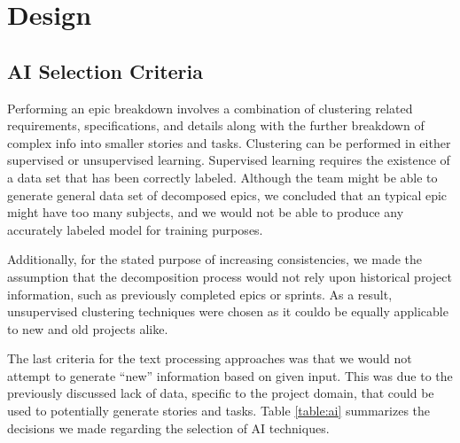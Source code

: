 \section{Design}
\label{design}

\subsection{AI Selection Criteria}
\label{subsection:criteria}
Performing an epic breakdown involves a combination of clustering related requirements, specifications, and details along with the further breakdown of complex info into smaller stories and tasks. Clustering can be performed in either supervised or unsupervised learning. Supervised learning requires the existence of a data set that has been correctly labeled. Although the team might be able to generate general data set of decomposed epics, we concluded that an typical epic might have too many subjects, and we would not be able to produce any accurately labeled model for training purposes. 

Additionally, for the stated purpose of increasing consistencies, we made the assumption that the decomposition process would not rely upon historical project information, such as previously completed epics or sprints. As a result, unsupervised clustering techniques were chosen as it couldo be equally applicable to new and old projects alike.

The last criteria for the text processing approaches was that we would not attempt to generate ``new'' information based on given input. This was due to the previously discussed lack of data, specific to the project domain, that could be used to potentially generate stories and tasks. Table \ref{table:ai} summarizes the decisions we made regarding the selection of AI techniques.

